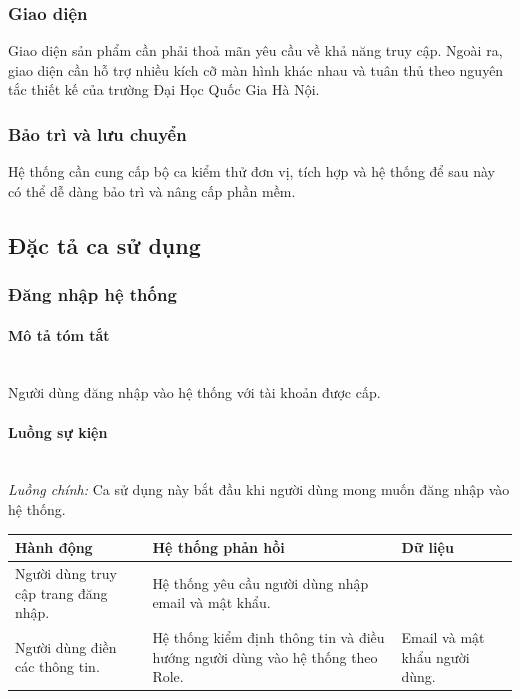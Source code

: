 \documentclass[./../main.tex]{subfiles}
\begin{document}
\hypertarget{giao-diux1ec7n}{%
\subsubsection{Giao diện}\label{giao-diux1ec7n}}

Giao diện sản phẩm cần phải thoả mãn yêu cầu về khả năng truy cập. Ngoài
ra, giao diện cần hỗ trợ nhiều kích cỡ màn hình khác nhau và tuân thủ
theo nguyên tắc thiết kế của trường Đại Học Quốc Gia Hà Nội.

\hypertarget{bux1ea3o-truxec-vuxe0-lux1b0u-chuyux1ec3n}{%
\subsubsection{Bảo trì và lưu
chuyển}\label{bux1ea3o-truxec-vuxe0-lux1b0u-chuyux1ec3n}}

Hệ thống cần cung cấp bộ ca kiểm thử đơn vị, tích hợp và hệ thống để sau
này có thể dễ dàng bảo trì và nâng cấp phần mềm.

\subsection{Đặc tả ca sử dụng}

\hypertarget{ux111ux103ng-nhux1eadp-hux1ec7-thux1ed1ng-1}{%
\subsubsection{Đăng nhập hệ
thống}\label{ux111ux103ng-nhux1eadp-hux1ec7-thux1ed1ng-1}}

\paragraph*{Mô tả tóm tắt} ~\\

Người dùng đăng nhập vào hệ thống với tài khoản được cấp.

\paragraph*{Luồng sự kiện} ~\\

\emph{Luồng chính:} Ca sử dụng này bắt đầu khi người dùng mong muốn đăng
nhập vào hệ thống.

\begin{table}[H]
  \begin{tabular}{|p{}|p{}|p{}|}
  \hline
  \textbf{Hành động}                   & \textbf{Hệ thống phản hồi}                                                    & \textbf{Dữ liệu}              \\ \hline
Người dùng truy cập trang đăng nhập. & Hệ thống yêu cầu người dùng nhập email và mật khẩu.                           &                               \\ \hline
Người dùng điền các thông tin.       & Hệ thống kiểm định thông tin và điều hướng người dùng vào hệ thống theo Role. & Email và mật khẩu người dùng. \\ \hline
  \end{tabular}
\end{table}
\end{document}
